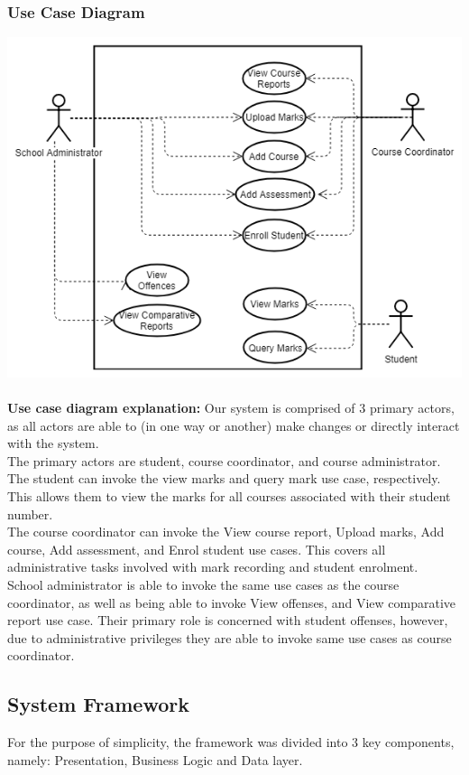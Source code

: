 \documentclass[paper=a4, fontsize=11pt]{scrartcl}
\numberwithin{equation}{section}		%
\numberwithin{figure}{section}			%
\numberwithin{table}{section}				%
\begin{document}
\subsubsection{Use Case Diagram}
\includegraphics[width = \textwidth]{Use Case.png}\\\\ \textbf{Use case diagram explanation:}
Our system is comprised of 3 primary actors, as all actors are able to (in one way or another) make changes or directly interact with the system.\\The primary actors are student, course coordinator, and course administrator.\\The student can invoke the view marks and query mark use case, respectively.  This allows them to view the marks for all courses associated with their student number.\\ The course coordinator can invoke the View course report, Upload marks, Add course, Add assessment, and Enrol student use cases. This covers all administrative tasks involved with  mark recording and student enrolment.\\ School administrator is able to invoke the same use cases as the course coordinator, as well as being able to invoke View offenses, and View comparative report use case. Their primary role is concerned with student offenses, however, due to administrative privileges they are able to invoke same use cases as course coordinator.



\subsection{System Framework}
For the purpose of simplicity, the framework was divided into 3 key components, namely: Presentation, Business Logic and Data layer.
\end{document}
